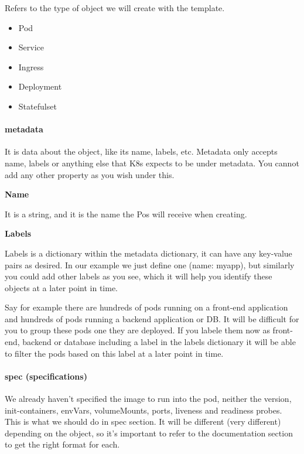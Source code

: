 \documentclass{article}
\begin{document}
Refers to the type of object we will create with the template.

\begin{itemize}
    \item Pod
    \item Service
    \item Ingress
    \item Deployment
    \item Statefulset
\end{itemize}

\paragraph{metadata}

It is data about the object, like its name, labels, etc. Metadata only accepts name, labels or anything else that K8s expects to be under metadata. You cannot add any other property as you wish under this.

\textbf{Name} 

It is a string, and it is the name the Pos will receive when creating.

\textbf{Labels}

Labels is a dictionary within the metadata dictionary, it can have any key-value pairs as desired. In our example we just define one (name: myapp), but similarly you could add other labels as you see, which it will help you identify these objects at a later point in time. 

Say for example there are hundreds of pods running on a front-end application and hundreds of pods running a backend application or DB. It will be difficult for you to group these pods one they are deployed. If you labele them now as front-end, backend or database including a label in the labels dictionary it will be able to filter the pods based on this label at a later point in time.

\paragraph{spec (specifications)}

We already haven't specified the image to run into the pod, neither the version, init-containers, envVars, volumeMounts, ports, liveness and readiness probes. This is what we should do in spec section. It will be different (very different) depending on the object, so it's important to refer to the documentation section to get the right format for each.
\end{document}
